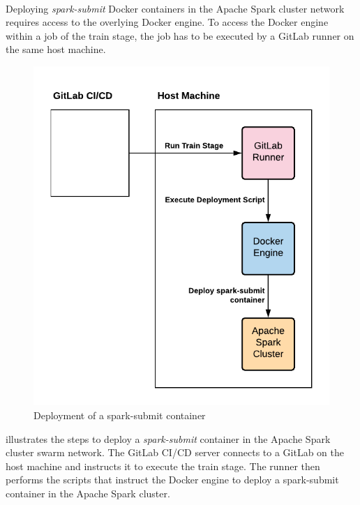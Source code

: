 \paragraph{}
Deploying \textit{spark-submit} Docker containers in the Apache Spark cluster network requires access to the overlying Docker engine.
To access the Docker engine within a job of the train stage, the job has to be executed by a GitLab runner on the same host machine.
\begin{figure}[h]
\centering
\includegraphics[scale=1]{images/05_conceptual_design/automated_deployment_pipeline/train_stage_runner}
\caption{Deployment of a spark-submit container}
\label{fig:05_deployment_train_concept}
\end{figure}
 illustrates the steps to deploy a \textit{spark-submit} container in the Apache Spark cluster swarm network.
The GitLab CI/CD server connects to a GitLab on the host machine and instructs it to execute the train stage.
The runner then performs the scripts that instruct the Docker engine to deploy a spark-submit container in the Apache Spark cluster.
